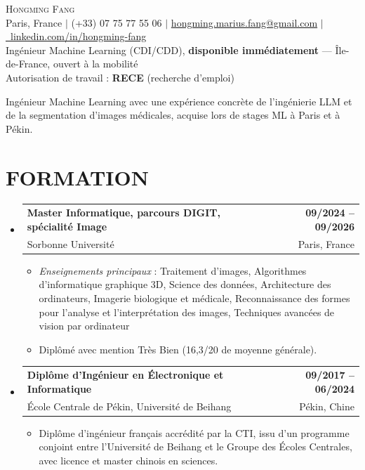\documentclass[a4paper,12pt]{article}
\makeatletter
\let\oldsection\section
\renewcommand{\section}[1]{\needspace{5\baselineskip}\oldsection{#1}}
\newcommand{\resumeItem}[1]{
  \item\small{
    {#1\vspace{-1pt}}
  }
}
\newcommand{\resumeSubheading}[4]{
  \vspace{-2pt plus 12pt}\item
    \begin{tabular*}{1.0\textwidth}[t]{l@{\extracolsep{\fill}}r}
      \textbf{#1} & \textbf{#2} \\
      {#3} & \textnormal{#4} \\
    \end{tabular*}\vspace{-7pt}\nopagebreak[4]
}
\newcommand{\resumeSubHeadingListStart}{\begin{itemize}[leftmargin=0.0in, label={}]}
\newcommand{\resumeSubHeadingListEnd}{\end{itemize}}
\newcommand{\resumeItemListStart}{\begin{itemize}}
\newcommand{\resumeItemListEnd}{\end{itemize}\vspace{-5pt}}
\makeatother
\begin{document}
\vspace*{-0.15in}
\begin{center}
    {\LARGE \scshape Hongming Fang} \\[2pt]
    \small Paris, France $|$ (+33) 07 75 77 55 06 $|$
    \href{mailto:hongming.marius.fang@gmail.com}{hongming.marius.fang@gmail.com} $|$
    \href{https://linkedin.com/in/hongming-fang}{\raisebox{-0.2\height}\faLinkedin\ linkedin.com/in/hongming-fang} \\
    {Ingénieur Machine Learning (CDI/CDD), \textbf{disponible immédiatement} — Île-de-France, ouvert à la mobilité} \\
    {Autorisation de travail : \textbf{RECE} (recherche d'emploi)}
    \vspace{-5pt}
\end{center}

\noindent\small{Ingénieur Machine Learning avec une expérience concrète de l'ingénierie LLM et de la segmentation d'images médicales, acquise lors de stages ML à Paris et à Pékin.}\par
\vspace{-4pt}

\section{FORMATION}
  \resumeSubHeadingListStart
    \resumeSubheading
    {Master Informatique, parcours DIGIT, spécialité Image}{09/2024 -- 09/2026}
    {Sorbonne Université}{Paris, France}
    \resumeItemListStart
     \resumeItem{\textit{Enseignements principaux} : Traitement d'images, Algorithmes d'informatique graphique 3D, Science des données, Architecture des ordinateurs, Imagerie biologique et médicale, Reconnaissance des formes pour l'analyse et l'interprétation des images, Techniques avancées de vision par ordinateur}
     \resumeItem{Diplômé avec mention Très Bien (16,3/20 de moyenne générale).}
    \resumeItemListEnd

    \resumeSubheading
      {Diplôme d'Ingénieur en Électronique et Informatique}{09/2017 -- 06/2024}
      {École Centrale de Pékin, Université de Beihang}{Pékin, Chine}
    \resumeItemListStart
        \resumeItem{Diplôme d'ingénieur français accrédité par la CTI, issu d'un programme conjoint entre l'Université de Beihang et le Groupe des Écoles Centrales, avec licence et master chinois en sciences.}
    \resumeItemListEnd
  \resumeSubHeadingListEnd
\end{document}
